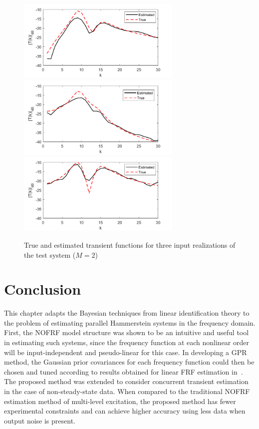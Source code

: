 \begin{figure}[h]
\centering
\includegraphics[width=0.7\textwidth]{Chapter7_NOFRFs/NOFRF_Transient1.pdf}
\includegraphics[width=0.7\textwidth]{Chapter7_NOFRFs/NOFRF_Transient4.pdf}
\includegraphics[width=0.7\textwidth]{Chapter7_NOFRFs/NOFRF_Transient5.pdf}
\caption{True and estimated transient functions for three input realizations of the test system ($M=2$)}
\label{fig:NOFRFTransientEstimates}
\end{figure}

\section{Conclusion}

This chapter adapts the Bayesian techniques from linear identification theory to the problem of estimating parallel Hammerstein systems in the frequency domain. First, the NOFRF model structure was shown to be an intuitive and useful tool in estimating such systems, since the frequency function at each nonlinear order will be input-independent and pseudo-linear for this case. In developing a GPR method, the Gaussian prior covariances for each frequency function could then be chosen and tuned according to results obtained for linear FRF estimation in~\cite{Lataire2016}. The proposed method was extended to consider concurrent transient estimation in the case of non-steady-state data. When compared to the traditional NOFRF estimation method of multi-level excitation, the proposed method has fewer experimental constraints and can achieve higher accuracy using less data when output noise is present. 


